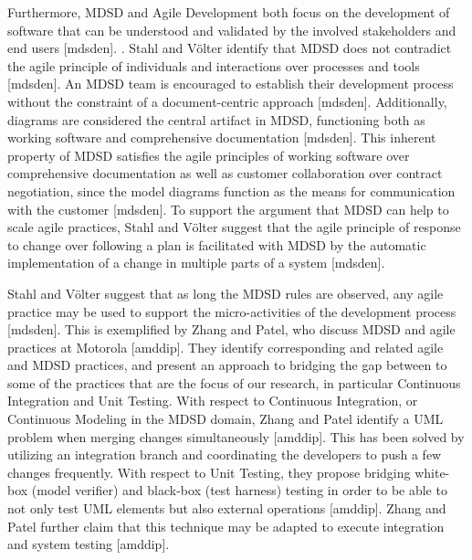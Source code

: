 \documentclass[fina_report_innit.tex]{subfiles}
\begin{document}
Furthermore, MDSD and Agile Development both focus on the development of software that can be understood and validated by the involved stakeholders and end users [mdsden]. . Stahl and Völter identify that MDSD does not contradict the agile principle of individuals and interactions over processes and tools [mdsden]. An MDSD team is encouraged to establish their development process without the constraint of a document-centric approach [mdsden]. Additionally, diagrams are considered the central artifact in MDSD, functioning both as working software and comprehensive documentation [mdsden]. This inherent property of MDSD satisfies the agile principles of working software over comprehensive documentation as well as customer collaboration over contract negotiation, since the model diagrams function as the means for communication with the customer [mdsden]. To support the argument that MDSD can help to scale agile practices, Stahl and Völter suggest that the agile principle of response to change over following a plan is facilitated with MDSD by the automatic implementation of a change in multiple parts of a system [mdsden].

Stahl and Völter suggest that as long the MDSD rules are observed, any agile practice may be used to support the micro-activities of the development process [mdsden]. This is exemplified by Zhang and Patel, who discuss MDSD and agile practices at Motorola [amddip]. They identify corresponding and related agile and MDSD practices, and present an approach to bridging the gap between to some of the practices that are the focus of our research, in particular Continuous Integration and Unit Testing. With respect to Continuous Integration, or Continuous Modeling in the MDSD domain, Zhang and Patel identify a UML problem when merging changes simultaneously [amddip]. This has been solved by utilizing an integration branch and coordinating the developers to push a few changes frequently. With respect to Unit Testing, they propose bridging white-box (model verifier) and black-box (test harness) testing in order to be able to not only test UML elements but also external operations [amddip]. Zhang and Patel further claim that this technique may be adapted to execute integration and system testing [amddip].
\end{document}
